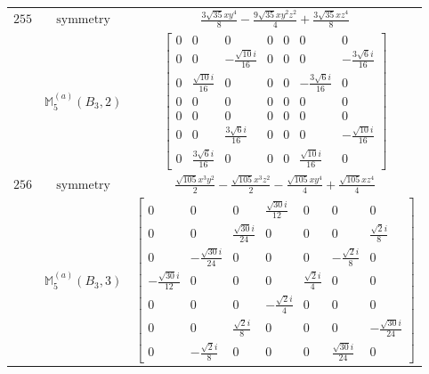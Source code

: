 \documentclass[fleqn,8pt,landscape]{jsarticle}
\begin{document}
\begin{longtable}{ccc}
$ 255 $ & $ \text{symmetry} $ & $ \frac{3 \sqrt{35} x y^{4}}{8} - \frac{9 \sqrt{35} x y^{2} z^{2}}{4} + \frac{3 \sqrt{35} x z^{4}}{8} $ \\
$  $ & $ \mathbb{M}_{5}^{(a)}(B_{3},2) $ & $ \begin{bmatrix} 0 & 0 & 0 & 0 & 0 & 0 & 0 \\ 0 & 0 & - \frac{\sqrt{10} i}{16} & 0 & 0 & 0 & - \frac{3 \sqrt{6} i}{16} \\ 0 & \frac{\sqrt{10} i}{16} & 0 & 0 & 0 & - \frac{3 \sqrt{6} i}{16} & 0 \\ 0 & 0 & 0 & 0 & 0 & 0 & 0 \\ 0 & 0 & 0 & 0 & 0 & 0 & 0 \\ 0 & 0 & \frac{3 \sqrt{6} i}{16} & 0 & 0 & 0 & - \frac{\sqrt{10} i}{16} \\ 0 & \frac{3 \sqrt{6} i}{16} & 0 & 0 & 0 & \frac{\sqrt{10} i}{16} & 0 \end{bmatrix} $ \\ \hline
$ 256 $ & $ \text{symmetry} $ & $ \frac{\sqrt{105} x^{3} y^{2}}{2} - \frac{\sqrt{105} x^{3} z^{2}}{2} - \frac{\sqrt{105} x y^{4}}{4} + \frac{\sqrt{105} x z^{4}}{4} $ \\
$  $ & $ \mathbb{M}_{5}^{(a)}(B_{3},3) $ & $ \begin{bmatrix} 0 & 0 & 0 & \frac{\sqrt{30} i}{12} & 0 & 0 & 0 \\ 0 & 0 & \frac{\sqrt{30} i}{24} & 0 & 0 & 0 & \frac{\sqrt{2} i}{8} \\ 0 & - \frac{\sqrt{30} i}{24} & 0 & 0 & 0 & - \frac{\sqrt{2} i}{8} & 0 \\ - \frac{\sqrt{30} i}{12} & 0 & 0 & 0 & \frac{\sqrt{2} i}{4} & 0 & 0 \\ 0 & 0 & 0 & - \frac{\sqrt{2} i}{4} & 0 & 0 & 0 \\ 0 & 0 & \frac{\sqrt{2} i}{8} & 0 & 0 & 0 & - \frac{\sqrt{30} i}{24} \\ 0 & - \frac{\sqrt{2} i}{8} & 0 & 0 & 0 & \frac{\sqrt{30} i}{24} & 0 \end{bmatrix} $ \\ \hline
\end{longtable}
\end{document}
